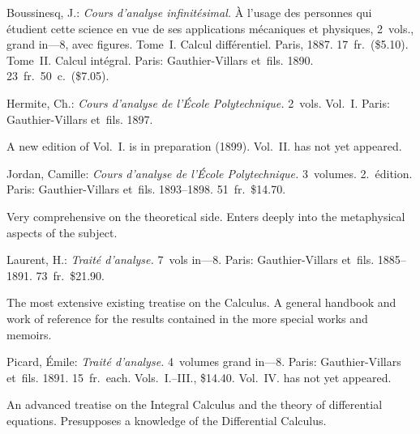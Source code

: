 \documentclass[12pt]{book}[2005/09/16]
\newcommand{\Chg}[2]{#2}
\newlength{\ParIndent}
\newenvironment{Book}{\medskip\par\noindent\hangindent\ParIndent\ignorespaces}{\par}
\newenvironment{Descrip}{%
  \begin{list}{}{%
      \setlength{\leftmargin}{1.5\ParIndent}%
      \setlength{\itemindent}{\ParIndent}%
      \setlength{\listparindent}{\ParIndent}%
      \setlength{\topsep}{4pt}%
      \item\small\ignorespaces%
  }%
}{%
\end{list}}
\renewcommand{\(}{{\upshape(}}
\renewcommand{\)}{{\upshape)}}
\newcommand{\Title}[1]{\textit{#1}}
\begin{document}
\begin{Book}
Boussinesq, J.: \Title{Cours d'analyse infinitésimal.} À l'usage des
personnes qui étudient cette science en vue de ses applications
mécaniques et physiques, 2~vols., grand in\Chg{-}{---}8, avec figures.
Tome~I\@. Calcul différentiel. Paris, 1887. 17~fr.\ (\$5.10).
Tome~II\@. Calcul intégral. Paris: Gauthier-Villars et~fils.
1890. 23~fr.\ 50~c.\ (\$7.05).
\end{Book}

\begin{Book}
Hermite, Ch.: \Title{Cours d'analyse de l'École Polytechnique.} 2~vols.
Vol.~I\@. Paris: Gauthier-Villars et~fils. 1897.

\begin{Descrip}
A new edition of Vol.~I. is in preparation (1899). Vol.~II. has not
yet appeared.
\end{Descrip}
\end{Book}

\begin{Book}
Jordan, Camille: \Title{Cours d'analyse de l'École Polytechnique.} 3~volumes.
2.~édition. Paris: Gauthier-Villars et~fils. 1893--1898.
51~fr.\ \$14.70.

\begin{Descrip}
Very comprehensive on the theoretical side. Enters deeply into
the metaphysical aspects of the subject.
\end{Descrip}
\end{Book}

\begin{Book}
Laurent, H.: \Title{Traité d'analyse.} 7~vols in---8. Paris: Gauthier-Villars
et~fils. 1885--1891. 73~fr.\ \$21.90.

\begin{Descrip}
The most extensive existing treatise on the Calculus. A general
handbook and work of reference for the results contained in the
more special works and memoirs.
\end{Descrip}
\end{Book}

\begin{Book}
Picard, Émile: \Title{Traité d'analyse.} 4~volumes grand in\Chg{-}{---}8. Paris:
Gauthier-Villars et~fils. 1891. 15~fr.\ each. Vols.~I.--III.,
\$14.40. Vol.~IV. has not yet appeared.

\begin{Descrip}
An advanced treatise on the Integral Calculus and the theory of
differential equations. Presupposes a knowledge of the Differential
Calculus.
\end{Descrip}
\end{Book}
\end{document}
